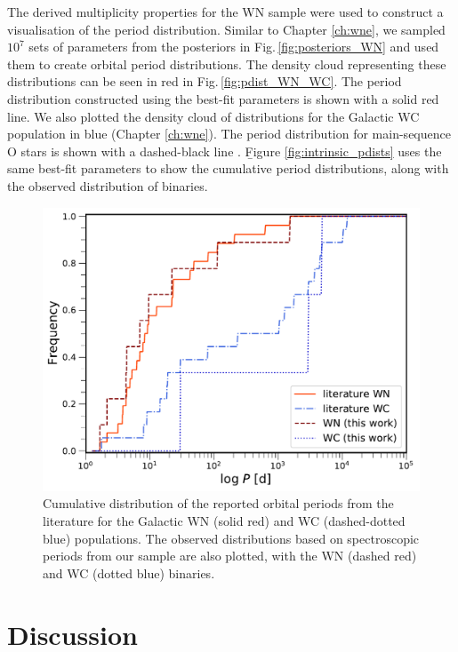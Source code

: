 The derived multiplicity properties for the WN sample were used to construct a visualisation of the period distribution. Similar to Chapter \ref{ch:wne}, we sampled $10^7$ sets of parameters from the posteriors in Fig.\,\ref{fig:posteriors_WN} and used them to create orbital period distributions. The density cloud representing these distributions can be seen in red in Fig.\,\ref{fig:pdist_WN_WC}. The period distribution constructed using the best-fit parameters is shown with a solid red line. We also plotted the density cloud of distributions for the Galactic WC population in blue (Chapter \ref{ch:wne}). The period distribution for main-sequence O stars is shown with a dashed-black line \citep{sana_binary_2012}. \b{Figure \ref{fig:intrinsic_pdists} uses the same best-fit parameters to show the cumulative period distributions, along with the observed distribution of binaries.}
\begin{figure}
    \centering
    \includegraphics[width=\hsize]{chapters/WNL/image/Cumulative_pobs_with_HERMES.pdf}
    \caption{Cumulative distribution of the reported orbital periods from the literature for the Galactic WN (solid red) and WC (dashed-dotted blue) populations. The observed distributions based on spectroscopic periods from our sample are also plotted, with the WN (dashed red) and WC (dotted blue) binaries.}
    \label{fig:obs_pdist_WNL}
\end{figure}
\section{Discussion} \label{sect:discussion_WNL}
